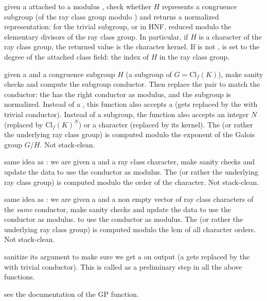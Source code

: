  given a 
attached to a modulus , check whether $H$ represents a congruence
subgroup (of the ray class group modulo ) and returns a normalized
representation:  for the trivial subgroup, or in HNF, reduced
modulo the elementary divisors of the ray class group. In particular, if $H$
is a character of the ray class group, the returned value is the character
kernel. If  is not ,  is set to the degree of the
attached class field: the index of $H$ in the ray class group.

 given a 
and a congruence subgroup $H$ (a subgroup of $G = \text{Cl}_f(K)$), make sanity checks and compute the subgroup
conductor. Then replace the pair to match the conductor: the 
has the right conductor as modulus, and the subgroup is normalized.
Instead of a , this function also accepts a  (gets replaced
by the  with trivial conductor). Instead of a subgroup,
the function also accepts an integer $N$ (replaced by $\text{Cl}_f(K)^N$)
or a character (replaced by its kernel). The  (or rather the
underlying ray class group) is computed modulo the exponent of the Galois
group $G / H$. Not stack-clean.

 same idea as
: we are given a 
and a ray class character, make sanity checks and update the data
to use the conductor as modulus. The  (or rather the underlying ray
class group) is computed modulo the order of the character. Not stack-clean.

 same idea as
: we are given a  and a non empty
vector of ray class characters of the \emph{same} conductor, make sanity
checks and update the data to use the conductor as modulus.
to use the conductor as modulus. The  (or rather the underlying ray
class group) is computed modulo the lcm of all character orders. Not
stack-clean.

 sanitize its argument to make sure we
get a  on output (a  gets replaced by the  with
trivial conductor). This is called as a preliminary step in all the above
 functions.

 see the documentation of
the GP function.

